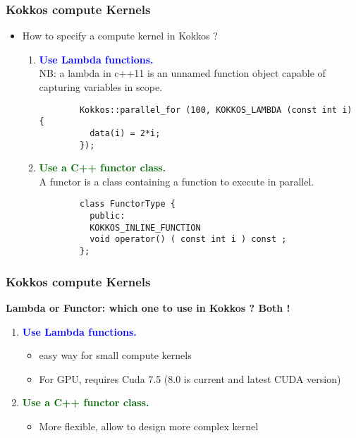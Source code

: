 \begin{frame}[fragile=singleslide]
  \frametitle{Kokkos compute Kernels}

  \begin{itemize}
  \item How to specify a compute kernel in Kokkos ?
    \begin{enumerate}
    \item \textcolor{blue}{\textbf{Use Lambda functions.}}\\
      NB: a lambda in c++11 is an unnamed function object capable of capturing variables in scope.
      \begin{verbatim}
        Kokkos::parallel_for (100, KOKKOS_LAMBDA (const int i) {
          data(i) = 2*i;
        });
      \end{verbatim}
    \item \textcolor{darkgreen}{\textbf{Use a C++ functor class.}}\\
      A functor is a class containing a function to execute in parallel.
      \begin{verbatim}
        class FunctorType {
          public:
          KOKKOS_INLINE_FUNCTION
          void operator() ( const int i ) const ;
        };
      \end{verbatim}
    \end{enumerate}
  \end{itemize}

\end{frame}


\begin{frame}[fragile=singleslide]
  \frametitle{Kokkos compute Kernels}

  \textbf{Lambda or Functor: which one to use in Kokkos ? Both !}
  \begin{enumerate}
  \item \textcolor{blue}{\textbf{Use Lambda functions.}}\\
    \begin{itemize}
    \item easy way for small compute kernels
    \item For GPU, requires Cuda 7.5 (8.0 is current and latest CUDA version)
    \end{itemize}
  \item \textcolor{darkgreen}{\textbf{Use a C++ functor class.}}\\
    \begin{itemize}
    \item More flexible, allow to design more complex kernel
    \end{itemize}
  \end{enumerate}
\end{frame}